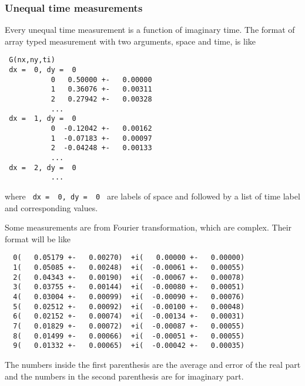 \documentclass[12pt]{article}
\begin{document}
\subsubsection{Unequal time measurements}
Every unequal time measurement is a function of imaginary time.
The format of array typed measurement with two arguments, space and time, is like
\begin{verbatim}
 G(nx,ny,ti)
 dx =  0, dy =  0
           0   0.50000 +-   0.00000
           1   0.36076 +-   0.00311
           2   0.27942 +-   0.00328
	       ...
 dx =  1, dy =  0
           0  -0.12042 +-   0.00162
           1  -0.07183 +-   0.00097
           2  -0.04248 +-   0.00133
	       ...
 dx =  2, dy =  0
	       ...
\end{verbatim}
where \verb| dx =  0, dy =  0 | are labels of space and followed by a list of
time label and corresponding values.

Some measurements are from Fourier transformation, which are complex. Their format will be
like
\begin{verbatim}
  0(   0.05179 +-   0.00270)  +i(   0.00000 +-   0.00000)
  1(   0.05085 +-   0.00248)  +i(  -0.00061 +-   0.00055)
  2(   0.04343 +-   0.00190)  +i(  -0.00067 +-   0.00078)
  3(   0.03755 +-   0.00144)  +i(  -0.00080 +-   0.00051)
  4(   0.03004 +-   0.00099)  +i(  -0.00090 +-   0.00076)
  5(   0.02512 +-   0.00092)  +i(  -0.00100 +-   0.00048)
  6(   0.02152 +-   0.00074)  +i(  -0.00134 +-   0.00031)
  7(   0.01829 +-   0.00072)  +i(  -0.00087 +-   0.00055)
  8(   0.01499 +-   0.00066)  +i(  -0.00051 +-   0.00055)
  9(   0.01332 +-   0.00065)  +i(  -0.00042 +-   0.00035)
\end{verbatim}
The numbers inside the first parenthesis are the average and error of the real part
and the numbers in the second parenthesis are for imaginary part.
\end{document}
